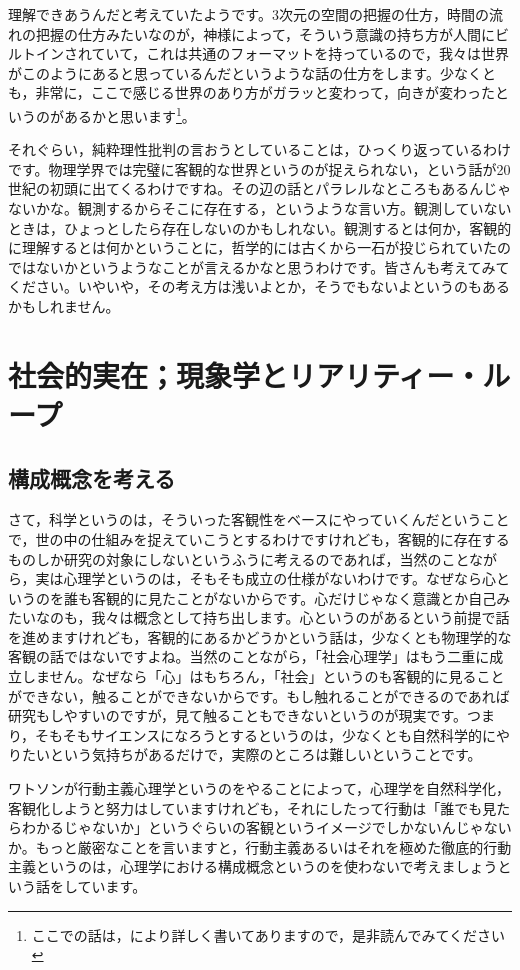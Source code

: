 \documentclass{ltjsbook}
\begin{document}
理解できあうんだと考えていたようです。3次元の空間の把握の仕方，時間の流れの把握の仕方みたいなのが，神様によって，そういう意識の持ち方が人間にビルトインされていて，これは共通のフォーマットを持っているので，我々は世界がこのようにあると思っているんだというような話の仕方をします。少なくとも，非常に，ここで感じる世界のあり方がガラッと変わって，向きが変わったというのがあるかと思います\footnote{ここでの話は，\textcite{Kurosaki2000}により詳しく書いてありますので，是非読んでみてください}。

それぐらい，純粋理性批判の言おうとしていることは，ひっくり返っているわけです。物理学界では完璧に客観的な世界というのが捉えられない，という話が20世紀の初頭に出てくるわけですね。その辺の話とパラレルなところもあるんじゃないかな。観測するからそこに存在する，というような言い方。観測していないときは，ひょっとしたら存在しないのかもしれない。観測するとは何か，客観的に理解するとは何かということに，哲学的には古くから一石が投じられていたのではないかというようなことが言えるかなと思うわけです。皆さんも考えてみてください。いやいや，その考え方は浅いよとか，そうでもないよというのもあるかもしれません。

\section{社会的実在；現象学とリアリティー・ループ}

\subsection{構成概念を考える}
さて，科学というのは，そういった客観性をベースにやっていくんだということで，世の中の仕組みを捉えていこうとするわけですけれども，客観的に存在するものしか研究の対象にしないというふうに考えるのであれば，当然のことながら，実は心理学というのは，そもそも成立の仕様がないわけです。なぜなら心というのを誰も客観的に見たことがないからです。心だけじゃなく意識とか自己みたいなのも，我々は概念として持ち出します。心というのがあるという前提で話を進めますけれども，客観的にあるかどうかという話は，少なくとも物理学的な客観の話ではないですよね。当然のことながら，「社会心理学」はもう二重に成立しません。なぜなら「心」はもちろん，「社会」というのも客観的に見ることができない，触ることができないからです。もし触れることができるのであれば研究もしやすいのですが，見て触ることもできないというのが現実です。つまり，そもそもサイエンスになろうとするというのは，少なくとも自然科学的にやりたいという気持ちがあるだけで，実際のところは難しいということです。

ワトソンが行動主義心理学というのをやることによって，心理学を自然科学化，客観化しようと努力はしていますけれども，それにしたって行動は「誰でも見たらわかるじゃないか」というぐらいの客観というイメージでしかないんじゃないか。もっと厳密なことを言いますと，行動主義あるいはそれを極めた徹底的行動主義というのは，心理学における構成概念というのを使わないで考えましょうという話をしています。
\end{document}

